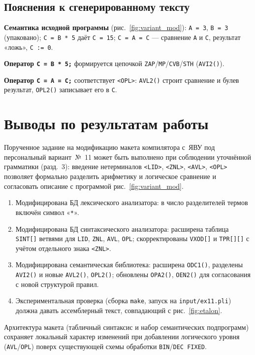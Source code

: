 \documentclass[a4paper,14pt]{extarticle}
\begin{document}
\subsection*{Пояснения к сгенерированному тексту}

\textbf{Семантика исходной программы} (рис.~\ref{fig:variant_mod}): \texttt{A = 3}, \texttt{B = 3} (упаковано);
\texttt{C = B * 5} даёт \texttt{C = 15}; \texttt{C = A = C} — сравнение \texttt{A} и \texttt{C}, результат «ложь», \texttt{C := 0}.

\textbf{Оператор \texttt{C = B * 5;}} формируется цепочкой \texttt{ZAP}/\texttt{MP}/\texttt{CVB}/\texttt{STH} (\texttt{AVI2()}).

\textbf{Оператор \texttt{C = A = C;}} соответствует \texttt{<OPL>}: \texttt{AVL2()} строит сравнение и булев результат,
\texttt{OPL2()} записывает его в \texttt{C}.

\section{Выводы по результатам работы}

Порученное задание на модификацию макета компилятора с~ЯВУ под персональный вариант~№~11 может быть выполнено при соблюдении
уточнённой грамматики (разд.~3): введение нетерминалов \texttt{<LID>}, \texttt{<ZNL>}, \texttt{<AVL>}, \texttt{<OPL>} позволяет
формально разделить арифметику и логическое сравнение и согласовать описание с программой рис.~\ref{fig:variant_mod}.

\begin{enumerate}
  \item Модифицирована БД лексического анализатора: в число разделителей термов включён символ «\texttt{*}».

  \item Модифицирована БД синтаксического анализатора: расширена таблица \texttt{SINT[]} ветвями для \texttt{LID}, \texttt{ZNL},
        \texttt{AVL}, \texttt{OPL}; скорректированы \texttt{VXOD[]} и \texttt{TPR[][]} с учётом отдельного знака \texttt{<ZNL>}.

  \item Модифицирована семантическая библиотека: расширена \texttt{ODC1()}, разделены \texttt{AVI2()} и новые \texttt{AVL2()}, \texttt{OPL2()};
        обновлены \texttt{OPA2()}, \texttt{OEN2()} для согласования с новой структурой правил.

  \item Экспериментальная проверка (сборка \texttt{make}, запуск на \texttt{input/ex11.pli}) должна давать ассемблерный текст,
        совпадающий с рис.~\ref{fig:etalon}.
\end{enumerate}

Архитектура макета (табличный синтаксис и набор семантических подпрограмм) сохраняет локальный характер изменений при добавлении
логического уровня (\texttt{AVL}/\texttt{OPL}) поверх существующей схемы обработки \texttt{BIN}/\texttt{DEC FIXED}.
\end{document}
